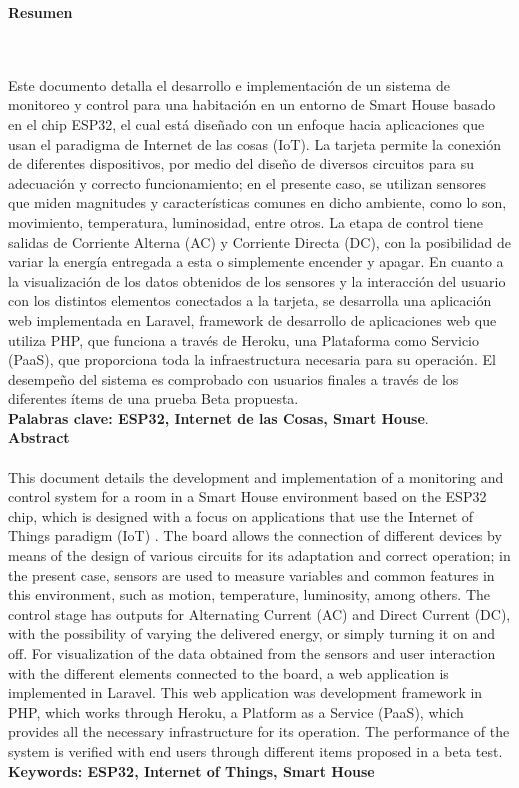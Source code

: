 \newpage
\thispagestyle{empty} \textbf{}\normalsize
\textbf{\LARGE Resumen}
\markboth{}{}
\\\\
 Este documento detalla el desarrollo e implementación de un sistema de monitoreo y control para una habitación en un entorno de Smart House basado en el chip ESP32, el cual está diseñado con un enfoque hacia aplicaciones que usan el paradigma de Internet de las cosas (IoT). La tarjeta permite la conexión de diferentes dispositivos, por medio del diseño de diversos circuitos para su adecuación y correcto funcionamiento; en el presente caso, se utilizan sensores que miden magnitudes y características comunes en dicho ambiente, como lo son, movimiento, temperatura, luminosidad, entre otros. La etapa de control tiene salidas de Corriente Alterna (AC) y Corriente Directa (DC), con la posibilidad de variar la energía entregada a esta o simplemente encender y apagar. En cuanto a la visualización de los datos obtenidos de los sensores y la interacción del usuario con los distintos elementos conectados a la tarjeta, se desarrolla una aplicación web implementada en Laravel, framework de desarrollo de aplicaciones web que utiliza PHP, que funciona a través de Heroku, una Plataforma como Servicio (PaaS), que proporciona toda la infraestructura necesaria para su operación. El desempeño del sistema es comprobado con usuarios finales a través de los diferentes ítems de una prueba Beta propuesta.\\
 
\textbf{\small Palabras clave: ESP32, Internet de las Cosas, Smart House}.\\[1.0cm]

\textbf{\LARGE Abstract}\\\\
This document details the development and implementation of a monitoring and control system for a room in a Smart House environment based on the ESP32 chip, which is designed with a focus on applications that use the Internet of Things paradigm (IoT) . The board allows the connection of different devices by means of the design of various circuits for its adaptation and correct operation; in the present case, sensors are used to measure variables and common features in this environment, such as motion, temperature, luminosity, among others. The control stage has outputs for Alternating Current (AC) and Direct Current (DC), with the possibility of varying the delivered energy, or simply turning it on and off. For visualization of the data obtained from the sensors and user interaction with the different elements connected to the board, a web application is implemented in Laravel. This web application was development framework in PHP, which works through Heroku, a Platform as a Service (PaaS), which provides all the necessary infrastructure for its operation. The performance of the system is verified with end users through different items proposed in a beta test.\\

\textbf{\small Keywords: ESP32, Internet of Things, Smart House}